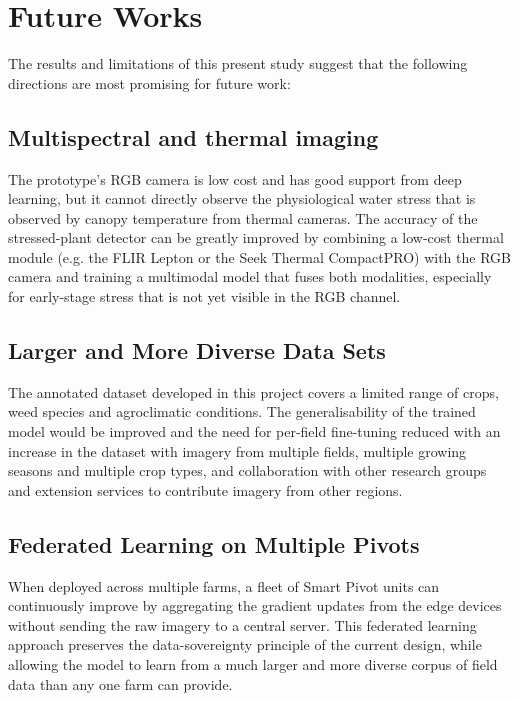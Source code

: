 \documentclass[12pt,a4paper]{report}
\begin{document}
\section{Future Works}

The results and limitations of this present study suggest that the following directions are most promising for future work:

\subsection{Multispectral and thermal imaging}

The prototype's RGB camera is low cost and has good support from deep learning, but it cannot directly observe the physiological water stress that is observed by canopy temperature from thermal cameras. The accuracy of the stressed-plant detector can be greatly improved by combining a low-cost thermal module (e.g. the FLIR Lepton or the Seek Thermal CompactPRO) with the RGB camera and training a multimodal model that fuses both modalities, especially for early-stage stress that is not yet visible in the RGB channel.

\subsection{Larger and More Diverse Data Sets}

The annotated dataset developed in this project covers a limited range of crops, weed species and agroclimatic conditions. The generalisability of the trained model would be improved and the need for per-field fine-tuning reduced with an increase in the dataset with imagery from multiple fields, multiple growing seasons and multiple crop types, and collaboration with other research groups and extension services to contribute imagery from other regions.

\subsection{Federated Learning on Multiple Pivots}

When deployed across multiple farms, a fleet of Smart Pivot units can continuously improve by aggregating the gradient updates from the edge devices without sending the raw imagery to a central server. This federated learning approach preserves the data-sovereignty principle of the current design, while allowing the model to learn from a much larger and more diverse corpus of field data than any one farm can provide.
\end{document}

